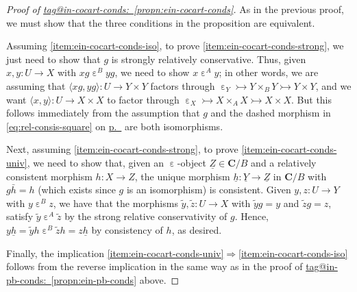 \documentclass{amsart}
\makeatletter
\newcommand\bC{\mathbf{C}}
\newcommand\br[1]{\langle{}#1\rangle{}}
\newcommand\ein{\mathrel{\varepsilon}}
\newcommand\To{\Rightarrow}
\newcommand\tto{\rightarrowtail}
\newcommand\und[1]{\underline{#1}}
\newcommand\unein{{\ein}}
\newcommand\tagword[1]{\csname tag@#1\endcsname}
\def\label@tag#1:#2\@nil{#1}
\newcommand\labeltag[1]{\label@tag#1:\@nil}
\newcommand\jref[1]{%
  \texorpdfstring%
    {\hyperref[#1]{\tagword{\labeltag{#1}}~\ref*{#1}}}%
    {\tagword{\labeltag{#1}}~\ref*{#1}}%
}
\newcommand\pref[1]{\hyperref[#1]{p.~\pageref*{#1}}}
\theoremstyle{definition}
\theoremstyle{remark}
\theoremstyle{plainwithref}
\makeatother
\begin{document}
\begin{proof}[Proof of \jref{propn:ein-cocart-conds}] \label{proof:ein-cocart-conds}
  As in the previous proof, we must show that the three conditions in the proposition are equivalent.

  Assuming \ref{item:ein-cocart-conds-iso}, to prove \ref{item:ein-cocart-conds-strong}, we just need to show that \( g \) is strongly relatively conservative.
  Thus, given \( x,y \colon U \to X \) with \( x g \ein^B y g \), we need to show \( x \ein^A y \); in other words, we are assuming that \( \br{x g, y g} \colon U \to Y \times Y \) factors through \( \unein_Y \tto Y \times_B Y \tto Y \times Y \), and we want \( \br{x,y} \colon U \to X \times X \) to factor through \( \unein_X \tto X \times_A X \tto X \times X \).
  But this follows immediately from the assumption that \( g \) and the dashed morphism in \eqref{eq:rel-consis-square} on \pref{eq:rel-consis-square} are both isomorphisms.

  Next, assuming \ref{item:ein-cocart-conds-strong}, to prove \ref{item:ein-cocart-conds-univ}, we need to show that, given an \( \ein \)-object \( \und Z \in \bC / B \) and a relatively consistent morphism \( h \colon X \to Z \), the unique morphism \( \und h \colon \und Y \to \und Z \) in \( \bC / B \) with \( g \bar h = h \) (which exists since \( g \) is an isomorphism) is consistent.
  Given \( y,z \colon U \to Y \) with \( y \ein^B z \), we have that the morphisms \( \tilde y, \tilde z \colon U \to X \) with \( \tilde y g = y \) and \( \tilde z g = z \), satisfy \( \tilde y \ein^A \tilde z \) by the strong relative conservativity of \( g \).
  Hence, \( y \und h = \tilde y h \ein^B \tilde z h = z \und h \) by consistency of \( h \), as desired.

  Finally, the implication \ref{item:ein-cocart-conds-univ}\( \To \)\ref{item:ein-cocart-conds-iso} follows from the reverse implication in the same way as in the proof of \jref{propn:ein-pb-conds} above.
\end{proof}
\end{document}
